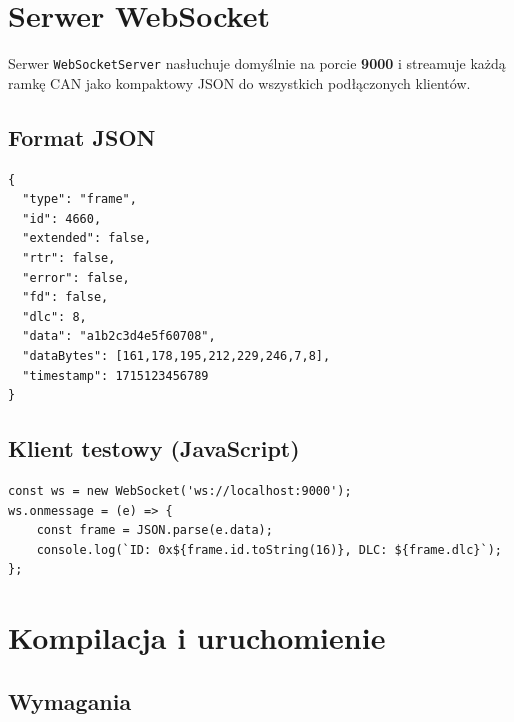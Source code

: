 \documentclass[a4paper,12pt]{article}
\begin{document}
\section{Serwer WebSocket}

Serwer \texttt{WebSocketServer} nasłuchuje domyślnie na porcie \textbf{9000} i streamuje każdą ramkę CAN jako kompaktowy JSON do wszystkich podłączonych klientów.

\subsection{Format JSON}

\begin{lstlisting}[style=jsonstyle, caption={JSON emitowany dla każdej ramki}]
{
  "type": "frame",
  "id": 4660,
  "extended": false,
  "rtr": false,
  "error": false,
  "fd": false,
  "dlc": 8,
  "data": "a1b2c3d4e5f60708",
  "dataBytes": [161,178,195,212,229,246,7,8],
  "timestamp": 1715123456789
}
\end{lstlisting}

\subsection{Klient testowy (JavaScript)}

\begin{lstlisting}[style=luastyle, caption={Klient WebSocket w przeglądarce}]
const ws = new WebSocket('ws://localhost:9000');
ws.onmessage = (e) => {
    const frame = JSON.parse(e.data);
    console.log(`ID: 0x${frame.id.toString(16)}, DLC: ${frame.dlc}`);
};
\end{lstlisting}

\section{Kompilacja i uruchomienie}

\subsection{Wymagania}
\end{document}
